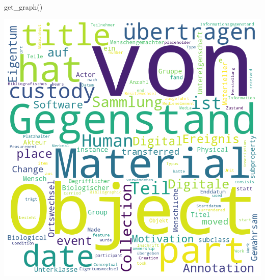\documentclass[
  a4paper,
]{book}
\newenvironment{Shaded}{\begin{snugshade}}{\end{snugshade}}
\newcommand{\NormalTok}[1]{\textcolor[rgb]{0.00,0.23,0.31}{#1}}
\begin{document}
\begin{Shaded}
\begin{Highlighting}[]
\NormalTok{get\_graph()}
\end{Highlighting}
\end{Shaded}

\includegraphics{section_files/figure-pdf/cell-5-output-1.png}


\backmatter
\end{document}
